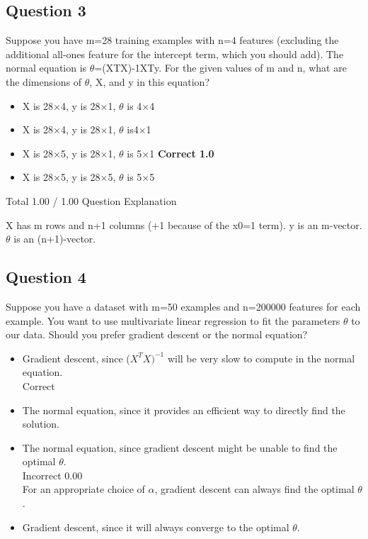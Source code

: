 \documentclass[]{article}
\begin{document}
\subsection*{Question 3}
Suppose you have m=28 training examples with n=4 features (excluding the additional 
all-ones feature for the intercept term, which you should add). The normal equation is $\theta$=(XTX)-1XTy. 
For the given values of m and n, what are the dimensions of $\theta$, X, and y in this equation?

\begin{itemize}
\item X is 28×4, y is 28×1, $\theta$ is 4×4			
\item X is 28×4, y is 28×1, $\theta$ is4×1			
\item X is 28×5, y is 28×1, $\theta$ is 5×1	\textbf{Correct	1.0}	
\item X is 28×5, y is 28×5, $\theta$ is 5×5
\end{itemize}			
Total		1.00 / 1.00	
Question Explanation

X has m rows and n+1 columns (+1 because of the x0=1 term). y is an m-vector. $\theta$ is an (n+1)-vector.
\subsection*{Question 4}
Suppose you have a dataset with m=50 examples and n=200000 features for each example. 
You want to use multivariate linear regression to fit the parameters $\theta$ to our data. 
Should you prefer gradient descent or the normal equation?

\begin{itemize}
\item Gradient descent, since ($X^TX)^{-1}$ will be very slow to compute in the normal equation.	
\\ Correct
		
\item The normal equation, since it provides an efficient way to directly find the solution.			
\item The normal equation, since gradient descent might be unable to find the optimal $\theta$.	
\\Incorrect	0.00	 \\ For an appropriate choice of $\alpha$, gradient descent can always find the optimal $\theta$.
\item Gradient descent, since it will always converge to the optimal $\theta$.			
\end{itemize}	
\end{document}
